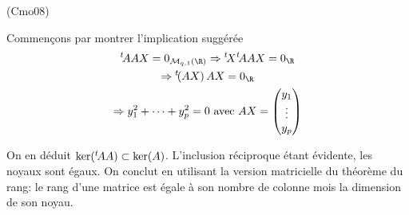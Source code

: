 \begin{tiny}(Cmo08)\end{tiny} Commençons par montrer l'implication suggérée
\begin{multline*}
  \mathstrut^t\!AAX = 0_{\mathcal M_{q,1}(\R)}
  \Rightarrow \mathstrut^t\!X\mathstrut^t\!AAX = 0_{\R}\\
  \Rightarrow \mathstrut^t\!(AX)\,AX = 0_{\R} \\
  \Rightarrow y_1^2+\cdots + y_p^2 = 0 
  \text{ avec } AX =
\begin{pmatrix}
  y_1\\\vdots \\ y_p
\end{pmatrix}
\end{multline*}

On en déduit $\ker(\mathstrut^t\!AA) \subset \ker(A)$.\newline
L'inclusion réciproque étant évidente, les noyaux sont égaux. On conclut en utilisant la version matricielle du théorème du rang: le rang d'une matrice est égale à son nombre de colonne mois la dimension de son noyau. 
